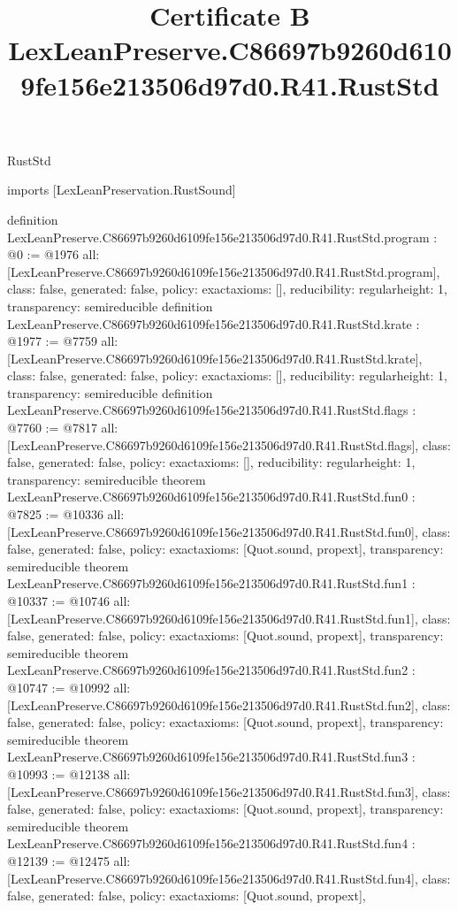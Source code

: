 \begin{lexlean}{RustStd}
\title{Certificate B LexLeanPreserve.C86697b9260d6109fe156e213506d97d0.R41.RustStd}
\begin{coremodule}
imports [LexLeanPreservation.RustSound]

definition LexLeanPreserve.C86697b9260d6109fe156e213506d97d0.R41.RustStd.program : @0 := @1976 {
  all: [LexLeanPreserve.C86697b9260d6109fe156e213506d97d0.R41.RustStd.program],
  class: false,
  generated: false,
  policy: exact{axioms: []},
  reducibility: regular{height: 1},
  transparency: semireducible
}
definition LexLeanPreserve.C86697b9260d6109fe156e213506d97d0.R41.RustStd.krate : @1977 := @7759 {
  all: [LexLeanPreserve.C86697b9260d6109fe156e213506d97d0.R41.RustStd.krate],
  class: false,
  generated: false,
  policy: exact{axioms: []},
  reducibility: regular{height: 1},
  transparency: semireducible
}
definition LexLeanPreserve.C86697b9260d6109fe156e213506d97d0.R41.RustStd.flags : @7760 := @7817 {
  all: [LexLeanPreserve.C86697b9260d6109fe156e213506d97d0.R41.RustStd.flags],
  class: false,
  generated: false,
  policy: exact{axioms: []},
  reducibility: regular{height: 1},
  transparency: semireducible
}
theorem LexLeanPreserve.C86697b9260d6109fe156e213506d97d0.R41.RustStd.fun0 : @7825 := @10336 {
  all: [LexLeanPreserve.C86697b9260d6109fe156e213506d97d0.R41.RustStd.fun0],
  class: false,
  generated: false,
  policy: exact{axioms: [Quot.sound, propext]},
  transparency: semireducible
}
theorem LexLeanPreserve.C86697b9260d6109fe156e213506d97d0.R41.RustStd.fun1 : @10337 := @10746 {
  all: [LexLeanPreserve.C86697b9260d6109fe156e213506d97d0.R41.RustStd.fun1],
  class: false,
  generated: false,
  policy: exact{axioms: [Quot.sound, propext]},
  transparency: semireducible
}
theorem LexLeanPreserve.C86697b9260d6109fe156e213506d97d0.R41.RustStd.fun2 : @10747 := @10992 {
  all: [LexLeanPreserve.C86697b9260d6109fe156e213506d97d0.R41.RustStd.fun2],
  class: false,
  generated: false,
  policy: exact{axioms: [Quot.sound, propext]},
  transparency: semireducible
}
theorem LexLeanPreserve.C86697b9260d6109fe156e213506d97d0.R41.RustStd.fun3 : @10993 := @12138 {
  all: [LexLeanPreserve.C86697b9260d6109fe156e213506d97d0.R41.RustStd.fun3],
  class: false,
  generated: false,
  policy: exact{axioms: [Quot.sound, propext]},
  transparency: semireducible
}
theorem LexLeanPreserve.C86697b9260d6109fe156e213506d97d0.R41.RustStd.fun4 : @12139 := @12475 {
  all: [LexLeanPreserve.C86697b9260d6109fe156e213506d97d0.R41.RustStd.fun4],
  class: false,
  generated: false,
  policy: exact{axioms: [Quot.sound, propext]},
}
\end{coremodule}
\end{lexlean}
